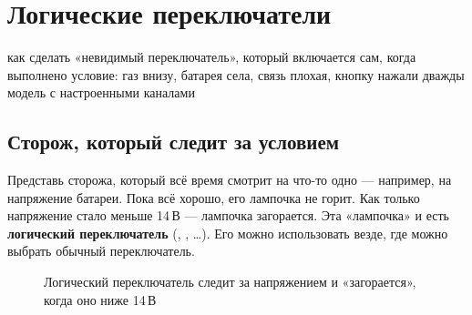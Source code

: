 \chapter{Логические переключатели}
\label{ch:logic}
\chapterintro
  {как сделать «невидимый переключатель», который включается сам, когда выполнено условие:
   газ внизу, батарея села, связь плохая, кнопку нажали дважды}
  {модель с настроенными каналами}

\section{Сторож, который следит за условием}

\begin{simple}
Представь сторожа, который всё время смотрит на что-то одно --- например, на напряжение
батареи. Пока всё хорошо, его лампочка не горит. Как только напряжение стало меньше 14\,В ---
лампочка загорается. Эта «лампочка» и есть \textbf{логический переключатель} (,
, …). Его можно использовать везде, где можно выбрать обычный переключатель.
\end{simple}

\begin{figure}[H]
\centering
{}
\caption{Логический переключатель  следит за напряжением и «загорается», когда оно
ниже 14\,В}
\end{figure}

